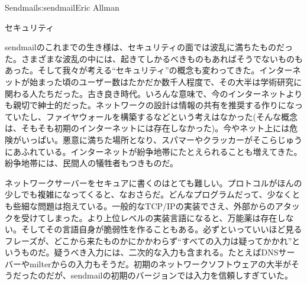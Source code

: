 \begin{aosachapter}{Sendmail}{s:sendmail}{Eric Allman}
\begin{aosasect1}{セキュリティ}

sendmailのこれまでの生き様は、セキュリティの面では波乱に満ちたものだった。さまざまな波乱の中には、起きてしかるべきものもあればそうでないものもあった。そして我々が考える``セキュリティ''の概念も変わってきた。インターネットが始まった頃のユーザー数はたかだか数千人程度で、その大半は学術研究に関わる人たちだった。古き良き時代。いろんな意味で、今のインターネットよりも親切で紳士的だった。ネットワークの設計は情報の共有を推奨する作りになっていたし、ファイヤウォールを構築するなどという考えはなかった(そんな概念は、そもそも初期のインターネットには存在しなかった)。今やネット上には危険がいっぱい。悪意に満ちた場所となり、スパマーやクラッカーがそこらじゅうにあふれている。インターネットが紛争地帯にたとえられることも増えてきた。紛争地帯には、民間人の犠牲者もつきものだ。

ネットワークサーバーをセキュアに書くのはとても難しい。プロトコルがほんの少しでも複雑になってくると、なおさらだ。どんなプログラムだって、少なくとも些細な問題は抱えている。一般的なTCP/IPの実装でさえ、外部からのアタックを受けてしまった。より上位レベルの実装言語になると、万能薬は存在しない。そしてその言語自身が脆弱性を作ることもある。必ずといっていいほど見るフレーズが、どこから来たものかにかかわらず``すべての入力は疑ってかかれ''というものだ。疑うべき入力には、二次的な入力も含まれる。たとえばDNSサーバーやmilterからの入力もそうだ。初期のネットワークソフトウェアの大半がそうだったのだが、sendmailの初期のバージョンでは入力を信頼しすぎていた。


\end{aosasect1}
\end{aosachapter}

